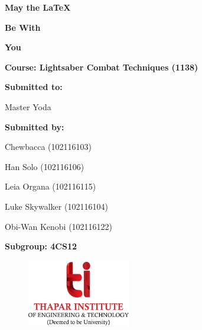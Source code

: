 \begin{titlepage}
    \centering
    {\Huge\bfseries May the \LaTeX{} \par}
    \vspace{0.5cm}
    {\Huge\bfseries Be With \par}
    \vspace{0.5cm}
    {\Huge\bfseries You \par}
    

    \vspace{1cm}

    {\Large\bfseries Course: Lightsaber Combat Techniques (1138) \par}

    
    \vspace{1.5cm}
    
    {\large \bfseries Submitted to: \par}
    {\large Master Yoda \par}
    
    \vspace{1cm}
    
    {\large \bfseries Submitted by: \par}
    {\large Chewbacca (102116103) \par}  
    {\large Han Solo (102116106) \par}  
    {\large Leia Organa (102116115) \par}  
    {\large Luke Skywalker (102116104) \par}  
    {\large Obi-Wan Kenobi (102116122) \par}  
    \vspace{0.5cm}
    {\large \bfseries Subgroup: 4CS12 \par}
    \vspace{0.5cm}
    
    \begin{figure}[h!]
        \centering
        \includegraphics[width=0.4\textwidth]{tietlogo.png}
    \end{figure}
    
    \vfill
    \end{titlepage}
    
        